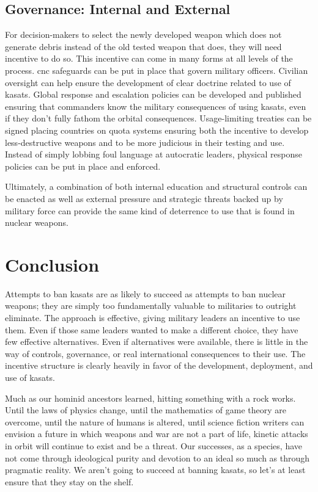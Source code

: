\subsection*{Governance: Internal and External}
For decision-makers to select the newly developed weapon which does
not generate debris instead of the old tested weapon that does, they
will need incentive to do so.  This incentive can come in many forms
at all levels of the process. \ac{cnc} safeguards can be put in place
that govern military officers.  Civilian oversight can help ensure the
development of clear doctrine related to use of \acp{kasat}.  Global
response and escalation policies can be developed and published
ensuring that commanders know the military consequences of using
\acp{kasat}, even if they don't fully fathom the orbital consequences.
Usage-limiting treaties can be signed placing countries on quota
systems ensuring both the incentive to develop less-destructive
weapons and to be more judicious in their testing and use.  Instead of
simply lobbing foul language at autocratic leaders, physical response
policies can be put in place and enforced.

Ultimately, a combination of both internal education and structural
controls can be enacted as well as external pressure and strategic
threats backed up by military force can provide the same kind of
deterrence to use that is found in nuclear weapons.

\section*{Conclusion}
Attempts to ban \acp{kasat} are as likely to succeed as attempts to
ban nuclear weapons; they are simply too fundamentally valuable to
militaries to outright eliminate.  The approach is effective, giving
military leaders an incentive to use them.  Even if those same leaders
wanted to make a different choice, they have few effective
alternatives.  Even if alternatives were available, there is little in
the way of controls, governance, or real international consequences to
their use.  The incentive structure is clearly heavily in favor of the
development, deployment, and use of \acp{kasat}.

Much as our hominid ancestors learned, hitting something with a rock
works.  Until the laws of physics change, until the mathematics of
game theory are overcome, until the nature of humans is altered, until
science fiction writers can envision a future in which weapons and war
are not a part of life, kinetic attacks in orbit will continue to
exist and be a threat.  Our successes, as a species, have not come
through ideological purity and devotion to an ideal so much as through
pragmatic reality.  We aren't going to succeed at banning
\aclp{kasat}, so let's at least ensure that they stay on the shelf.

